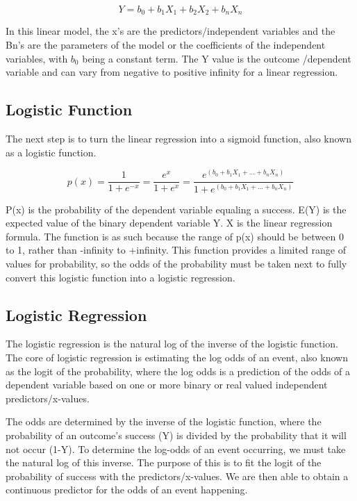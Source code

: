 \documentclass[letterpaper, 10 pt, conference]{ieeeconf}  %
\begin{document}
$$Y = b_0 + b_1X_1 + b_2X_2 + b_nX_n$$

In this linear model, the x’s are the predictors/independent variables and the Bn’s are the parameters of the model or the coefficients of the independent variables, with $b_0$ being a constant term. The Y value is the outcome /dependent variable and can vary from negative to positive infinity for a linear regression.  %

\subsection{Logistic Function}
The next step is to turn the linear regression into a sigmoid function, also known as a logistic function. 

$$p(x) =  \frac{1}{1+e^{-x}}   =   \frac{e^x}{1+e^x} 
= \frac{e^{(b_0 + b_1X_1 + ... + b_nX_n)}}{1+e^{(b_0 + b_1X_1 + ... + b_nX_n)}}$$

P(x) is the probability of the dependent variable equaling a success. E(Y) is the expected value of the binary dependent variable Y. X is the linear regression formula. The function is as such because the range of p(x) should be between 0 to 1, rather than -infinity to +infinity. This function provides a limited range of values for probability, so the odds of the probability must be taken next to fully convert this logistic function into a logistic regression. %

\subsection{Logistic Regression} 
The logistic regression is the natural log of the inverse of the logistic function. The core of logistic regression is estimating the log odds of an event, also known as the logit of the probability, where the log odds is a prediction of the odds of a dependent variable based on one or more binary or real valued independent predictors/x-values.

The odds are determined by the inverse of the logistic function, where the probability of an outcome’s success (Y) is divided by the probability that it will not occur (1-Y). To determine the log-odds of an event occurring, we must take the natural log of this inverse. The purpose of this is to fit the logit of the probability of success with the predictors/x-values. We are then able to obtain a continuous predictor for the odds of an event happening.
\end{document}
